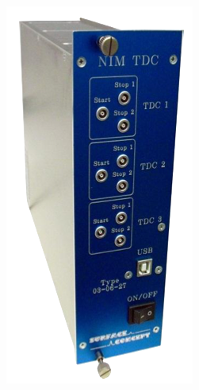 \begin{figure}[p]
	\vspace{1cm}
    \begin{subfigure}[t]{0.2\textwidth}
        \includegraphics[height=0.25\textheight, width=\textwidth, keepaspectratio]{figures/NIM_TDC.png}

\end{subfigure}
\end{figure}
